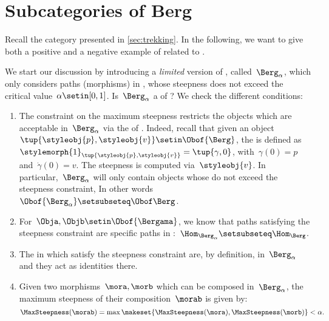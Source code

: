 
\section{Subcategories of Berg}
\label{sec:subcat_berg}

Recall the category \Berg presented in \cref{sec:trekking}.
In the following, we want to give both a positive and a negative example of  related to \Berg.

We start our discussion by introducing a \emph{limited} version of \Berg, called~$\Berg_\alpha$, which only considers paths (morphisms) in \Berg, whose steepness does not exceed the critical value~$\alpha\setin [0,1]$.
Is~$\Berg_\alpha$ a  of \Berg?
We check the different conditions:
\begin{enumerate}
    \item The constraint on the maximum steepness restricts the objects which are acceptable in~$\Berg_\alpha$ via the  of \Berg.
          Indeed, recall that given an object~$\tup{\styleobj{p},\styleobj{v}}\setin \Obof{\Berg}$, the  is defined as~$\stylemorph{1}_{\tup{\styleobj{p},\styleobj{v}}}=\tup{\gamma,0}$, with~$\gamma(0)=p$ and~$\dot{\gamma}(0)=v$.
          The steepness is computed via~$\styleobj{v}$.
          In particular,~$\Berg_\alpha$ will only contain objects whose  do not exceed the steepness constraint, In other words~$\Obof{\Berg_\alpha} \setsubseteq \Obof\Berg$.
    \item For~$\Obja,\Objb\setin \Obof{\Bergama}$, we know that paths satisfying the steepness constraint are specific paths in \Berg:~$\Hom_{\Berg_\alpha}\setsubseteq \Hom_{\Berg}$.
    \item The   in \Berg which satisfy the steepness constraint are, by definition, in~$\Berg_\alpha$ and they act as identities there.
    \item Given two morphisms~$\mora,\morb$ which can be composed in~$\Berg_\alpha$, the maximum steepness of their composition~$\morab$ is given by:
          \begin{equation}
              \MaxSteepness(\morab)
              =
              \max \makeset{
                  \MaxSteepness(\mora),
                  \MaxSteepness(\morb)
              }
              <
              \alpha.
          \end{equation}
\end{enumerate}

